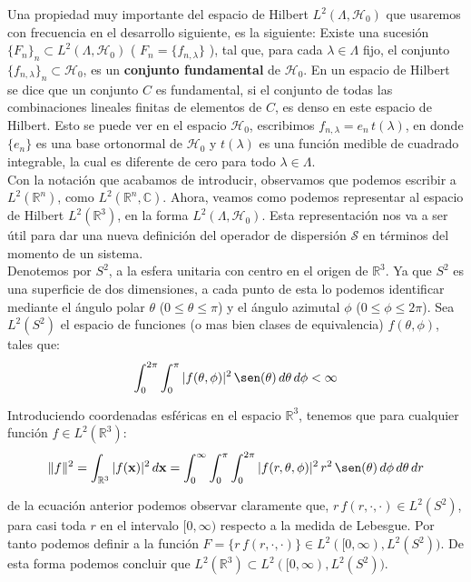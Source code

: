 \documentclass[12pt]{book}
\numberwithin{equation}{chapter}
\def\R{\mathbb{R}}
\def\C{\mathbb{C}}
\def\S{\mathcal{S}}
\def\t{\theta}
\def\H{\mathcal{H}}
\def\x{\mathbf{x}}
\begin{document}
Una propiedad muy importante del espacio de Hilbert $L^{2}(\Lambda ,\H_{0})$ que usaremos con frecuencia en el desarrollo siguiente, es la siguiente: Existe una sucesi\'on $\{ F_{n} \}_{n} \subset L^{2}(\Lambda ,\H_{0})$ ( $F_{n}=\{ f_{n,\lambda} \}$ ), tal que, para cada $\lambda \in \Lambda$ fijo, el conjunto $\{ f_{n,\lambda} \}_{n} \subset \H_{0}$, es un {\bf conjunto fundamental} de $\H_{0}$. En un espacio de Hilbert se dice que un conjunto $C$ es fundamental, si el conjunto de todas las combinaciones lineales finitas de elementos de $C$, es denso en este espacio de Hilbert. Esto se puede ver en el espacio $\H_{0}$, escribimos $f_{n,\lambda} = e_{n} \, t(\lambda) $, en donde $\{ e_{n} \}$ es una base ortonormal de $\H_{0}$ y $t(\lambda)$ es una funci\'on medible de cuadrado integrable, la cual es diferente de cero para todo $ \lambda \in \Lambda $.\\

Con la notaci\'on que acabamos de introducir, observamos que podemos escribir a $L^{2}(\R^{n})$, como $L^{2}(\R^{n},\C)$. Ahora, veamos como podemos representar al espacio de Hilbert $L^{2}(\R^{3})$, en la forma $L^{2}(\Lambda , \H_{0})$. Esta representaci\'on nos va a ser \'util para dar una nueva definici\'on del operador de dispersi\'on $\S$ en t\'erminos del momento de un sistema.\\

Denotemos por $S^{2}$, a la esfera unitaria con centro en el origen de $\R^{3}$. Ya que $S^{2}$ es una superficie de dos dimensiones, a cada punto de esta lo podemos identificar mediante el \'angulo polar $\t$ ($0 \leq \t \leq \pi$) y el \'angulo azimutal $\phi$ ($0 \leq \phi \leq 2 \pi  $). Sea $L^{2}(S^{2})$ el espacio de funciones (o mas bien clases de equivalencia) $f(\t , \phi)$, tales que:
\begin{equation}
\int_{0}^{2\pi} \int_{0}^{\pi} | f(\t , \phi) |^{2} \, \sen (\t) \, d \t \, d \phi < \infty 
\end{equation}

Introduciendo coordenadas esf\'ericas en el espacio $\R^{3}$, tenemos que para cualquier funci\'on $f \in L^{2}(\R^{3})$:
\begin{equation}
\| f \|^{2}= \int_{\R^{3}} |f(\x)|^{2} \, d\x = \int_{0}^{\infty} \int_{0}^{\pi} \int_{0}^{2\pi} | f(r,\t , \phi) |^{2} \, r^{2} \, \sen(\t) \, d\phi \, d\t \, dr 
\end{equation}

de la ecuaci\'on anterior podemos observar claramente que, $r\, f(r , \cdot ,\cdot ) \in L^{2}(S^{2})$, para casi toda $r$ en el intervalo $[ 0,\infty )$ respecto a la medida de Lebesgue. Por tanto podemos definir a la funci\'on $F = \{  r\, f(r , \cdot ,\cdot ) \} \in L^{2}( [0,\infty),L^{2}(S^{2}) ) $. De esta forma podemos concluir que $ L^{2}(\R^{3}) \subset L^{2}( [0,\infty),L^{2}(S^{2}) ) $.\\
\end{document}
